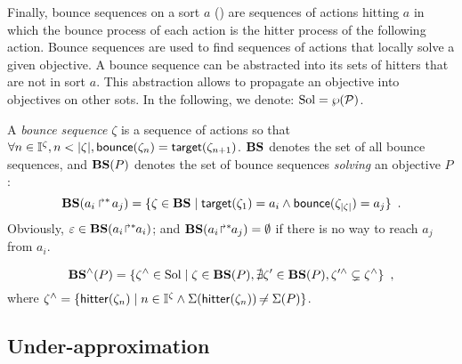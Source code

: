 Finally, bounce sequences on a sort $a$ () are sequences of actions hitting $a$ in which the bounce process of each action is the hitter process of the following action.
Bounce sequences are used to find sequences of actions that locally solve a given objective.
A bounce sequence can be abstracted into its sets of hitters that are not in sort $a$.
This abstraction allows to propagate an objective into objectives on other sots.
In the following, we denote: $\mathrm{Sol} = \wp(\mathcal{P})$.
\begin{definition}
\label{def:bs}
  A \emph{bounce sequence} $\zeta$ is a sequence of actions so that $\forall n \in \mathbb{I}^{\zeta}, n < |\zeta|, \mathsf{bounce}(\zeta_{n}) = \mathsf{target}(\zeta_{n+1})$.
  $\mathbf{BS}$ denotes the set of all bounce sequences, and
  $\mathbf{BS}(P)$ denotes the set of bounce sequences \emph{solving} an objective $P$:
  \[
    \mathbf{BS}(\mbox{$a_i\Rsh^*\!a_j$}) = \{ \zeta \in \mathbf{BS} \mid \mathsf{target}(\zeta_1)= a_i \wedge \mathsf{bounce}(\zeta_{|\zeta|}) = a_j \} \enspace.
  \]
  Obviously, $\varepsilon \in \mathbf{BS}({a_i\!\Rsh^*\!\!a_i})$; and $\mathbf{BS}({a_i\!\Rsh^*\!\!a_j}) = \emptyset$ if there is no way to reach $a_j$ from $a_i$.
\end{definition}
%
\begin{definition}[$\aBS:\Obj \mapsto \powerset(\Sol)$]
\label{def:aBS}
  \[
    \mathbf{BS}^\wedge(P) = \{ \zeta^\wedge \in \mathrm{Sol} \mid \zeta \in \mathbf{BS}(P), \nexists \zeta' \in \mathbf{BS}(P), \zeta'^\wedge \subsetneq \zeta^\wedge \} \enspace,
  \]
  where $\zeta^\wedge = \{ \mathsf{hitter}(\zeta_n) \mid  n \in \mathbb{I}^{\zeta} \wedge \Sigma(\mathsf{hitter}(\zeta_n)) \not\nobreak\mkern -2mu = \Sigma(P) \}$.
\end{definition}



\subsection{Under-approximation}

